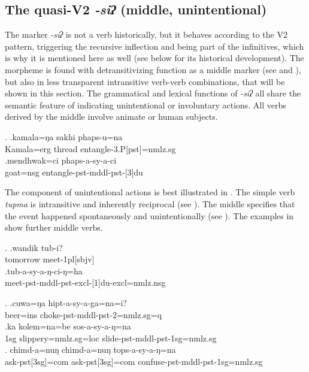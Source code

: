 \subsection{The quasi-V2 \emph{-siʔ} (middle, unintentional)}\label{V2-mddl}

The marker \emph{-siʔ} is not a verb historically, but it behaves according to the V2 pattern, triggering the recursive inflection and being part of the infinitives, which is why it is mentioned here as well (see below for its historical development). The morpheme is found with detransitivizing function as a middle  marker (see \Next and ),  but also in less transparent intransitive verb-verb combinations, that will be shown in this section. The grammatical and lexical functions of  \emph{-siʔ} all share the semantic feature of indicating unintentional  or involuntary  actions. All verbs derived by the middle involve animate or human subjects.

\ex. \ag.kamala=ŋa sakhi phaps-u=na  \\
		Kamala{\sc =erg} thread entangle-{\sc 3.P[pst]=nmlz.sg}\\
 	\bg.mendhwak=ci phaps-a-sy-a-ci\\
	goat{\sc =nsg} entangle-{\sc pst-mddl-pst-[3]du}\\
	
The component of unintentional actions is best illustrated in \Next. The simple verb \emph{tupma}  is  intransitive and inherently reciprocal (see \Next[a]). The middle specifies that the event happened spontaneously and unintentionally (see \Next[b]). The examples in \NNext show further middle verbs. 
	
\ex. \ag.wandik tub-i?\\
		tomorrow meet{\sc -1pl[sbjv]}\\
 	\bg.tub-a-sy-a-ŋ-ci-ŋ=ha\\
		meet-{\sc pst-mddl-pst-excl-[1]du-excl=nmlz.nsg}\\
	
\ex. \ag.cuwa=ŋa hipt-a-sy-a-ga=na=i?\\
		beer{\sc =ins} choke-{\sc pst-mddl-pst-2=nmlz.sg=q}	\\
 	\bg.ka kolem=na=be sos-a-sy-a-ŋ=na\\
	{\sc 1sg} slippery={\sc nmlz.sg=loc} slide{\sc -pst-mddl-pst-1sg=nmlz.sg}  	\\
	\bg. chimd-a=nuŋ chimd-a=nuŋ tops-a-sy-a-ŋ=na\\
	 ask-{\sc pst[3sg]=com} ask-{\sc pst[3sg]=com} confuse{\sc -pst-mddl-pst-1sg=nmlz.sg}\\

